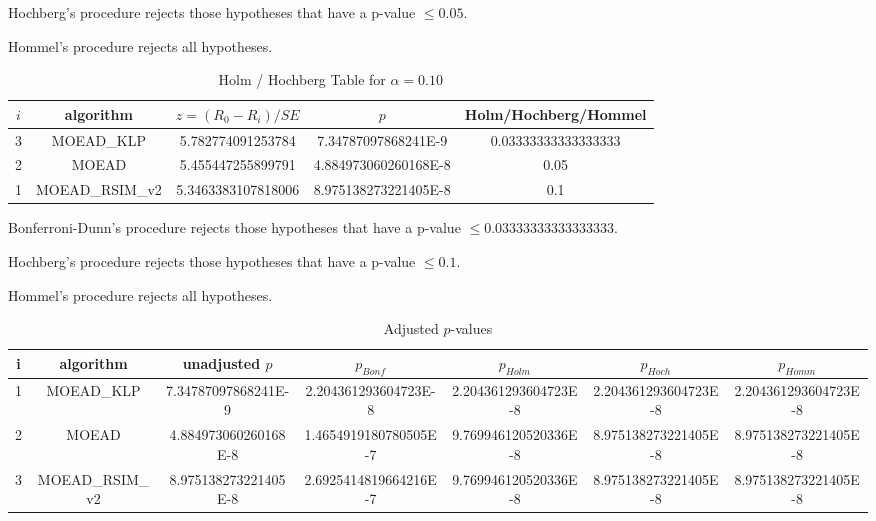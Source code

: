 \documentclass[a4paper,10pt]{article}
\begin{document}
\begin{landscape}
Hochberg's procedure rejects those hypotheses that have a p-value $\le0.05$.


Hommel's procedure rejects all hypotheses.


\begin{table}[!htp]
\centering\tiny
\caption{Holm / Hochberg Table for $\alpha=0.10$}
\begin{tabular}{ccccc}
$i$&algorithm&$z=(R_0 - R_i)/SE$&$p$&Holm/Hochberg/Hommel\\
\hline
3&MOEAD_KLP&5.782774091253784&7.34787097868241E-9&0.03333333333333333\\
2&MOEAD&5.455447255899791&4.884973060260168E-8&0.05\\
1&MOEAD_RSIM_v2&5.3463383107818006&8.975138273221405E-8&0.1\\
\hline
\end{tabular}
\end{table}
Bonferroni-Dunn's procedure rejects those hypotheses that have a p-value $\le0.03333333333333333$.


Hochberg's procedure rejects those hypotheses that have a p-value $\le0.1$.


Hommel's procedure rejects all hypotheses.


\begin{table}[!htp]
\centering\tiny
\caption{Adjusted $p$-values}
\begin{tabular}{ccccccc}
i&algorithm&unadjusted $p$&$p_{Bonf}$&$p_{Holm}$&$p_{Hoch}$&$p_{Homm}$\\
\hline
1&MOEAD_KLP&7.34787097868241E-9&2.204361293604723E-8&2.204361293604723E-8&2.204361293604723E-8&2.204361293604723E-8\\
2&MOEAD&4.884973060260168E-8&1.4654919180780505E-7&9.769946120520336E-8&8.975138273221405E-8&8.975138273221405E-8\\
3&MOEAD_RSIM_v2&8.975138273221405E-8&2.6925414819664216E-7&9.769946120520336E-8&8.975138273221405E-8&8.975138273221405E-8\\
\hline
\end{tabular}
\end{table}


\end{landscape}
\end{document}
